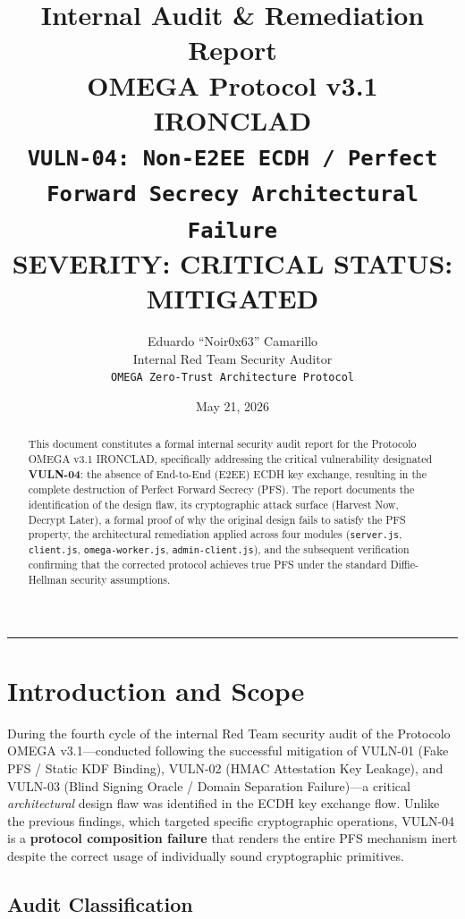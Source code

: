 \documentclass[12pt,a4paper]{article}
\title{
    \textbf{Internal Audit \& Remediation Report}\\[0.5em]
    \Large OMEGA Protocol v3.1 IRONCLAD\\[0.3em]
    \large \texttt{VULN-04: Non-E2EE ECDH / Perfect Forward Secrecy Architectural Failure}\\[1em]
    \normalsize \textcolor{criticalred}{\textbf{SEVERITY: CRITICAL}} \quad
    \textcolor{safegreen}{\textbf{STATUS: MITIGATED}}
}
\author{
    Eduardo ``Noir0x63'' Camarillo\\
    \small Internal Red Team Security Auditor\\
    \small \texttt{OMEGA Zero-Trust Architecture Protocol}
}
\date{May 21, 2026}
\begin{document}

\maketitle
\hrule
\vspace{1em}

\begin{abstract}
This document constitutes a formal internal security audit report for the Protocolo OMEGA v3.1 IRONCLAD, specifically addressing the critical vulnerability designated \textbf{VULN-04}: the absence of End-to-End (E2EE) ECDH key exchange, resulting in the complete destruction of Perfect Forward Secrecy (PFS). The report documents the identification of the design flaw, its cryptographic attack surface (Harvest Now, Decrypt Later), a formal proof of why the original design fails to satisfy the PFS property, the architectural remediation applied across four modules (\texttt{server.js}, \texttt{client.js}, \texttt{omega-worker.js}, \texttt{admin-client.js}), and the subsequent verification confirming that the corrected protocol achieves true PFS under the standard Diffie-Hellman security assumptions.
\end{abstract}

\tableofcontents
\newpage

\section{Introduction and Scope}

During the fourth cycle of the internal Red Team security audit of the Protocolo OMEGA v3.1---conducted following the successful mitigation of VULN-01 (Fake PFS / Static KDF Binding), VULN-02 (HMAC Attestation Key Leakage), and VULN-03 (Blind Signing Oracle / Domain Separation Failure)---a critical \textit{architectural} design flaw was identified in the ECDH key exchange flow. Unlike the previous findings, which targeted specific cryptographic operations, VULN-04 is a \textbf{protocol composition failure} that renders the entire PFS mechanism inert despite the correct usage of individually sound cryptographic primitives.

\subsection{Audit Classification}
\end{document}
